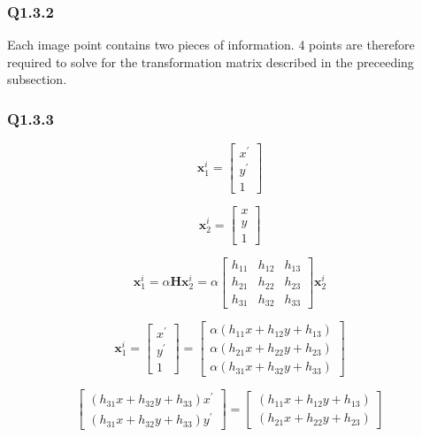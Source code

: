 \documentclass[12pt]{article}
\begin{document}
\subsubsection{Q1.3.2}
Each image point contains two pieces of information. 4 points are therefore required to solve for the transformation matrix described in the preceeding subsection.
\subsubsection{Q1.3.3}
$$
\textbf{x}^{i}_{1}=
\begin{bmatrix}
x^{ \prime } \\ y ^ { \prime } \\ 1
\end{bmatrix}
$$

$$
\textbf{x}^{i}_{2}=
\begin{bmatrix}
x \\ y \\ 1
\end{bmatrix}
$$

$$
\textbf{x}^{i}_{1}=
\alpha
\textbf{H}
\textbf{x}^{i}_{2}
=
\alpha
\begin{bmatrix}
h_{11} & h_{12} & h_{13} \\
h_{21} & h_{22} & h_{23} \\
h_{31} & h_{32} & h_{33} 
\end{bmatrix}
\textbf{x}^{i}_{2}
$$

$$
\textbf{x}^{i}_{1}=
\begin{bmatrix}
x^{ \prime } \\ y ^ { \prime } \\ 1
\end{bmatrix}
=
\begin{bmatrix}
\alpha ( h_{11} x + h_{12} y + h_{13} ) \\
\alpha ( h_{21} x + h_{22} y + h_{23} ) \\
\alpha ( h_{31} x + h_{32} y + h_{33} )
\end{bmatrix}
$$

$$
\begin{bmatrix}
( h_{31} x + h_{32} y + h_{33} ) x^{ \prime } \\ 
( h_{31} x + h_{32} y + h_{33} ) y^ { \prime } 
\end{bmatrix}
=
\begin{bmatrix}
( h_{11} x + h_{12} y + h_{13} ) \\
( h_{21} x + h_{22} y + h_{23} )
\end{bmatrix}
$$
\end{document}
